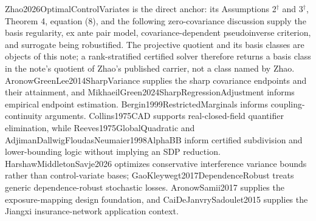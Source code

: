 Zhao2026OptimalControlVariates is the direct anchor: its Assumptions 2\(^{\dagger}\) and 3\(^{\dagger}\), Theorem 4, equation (8), and the following zero-covariance discussion supply the basis regularity, ex ante pair model, covariance-dependent pseudoinverse criterion, and surrogate being robustified.  The projective quotient and its basis classes are objects of this note; a rank-stratified certified solver therefore returns a basis class in the note's quotient of Zhao's published carrier, not a class named by Zhao.  AronowGreenLee2014SharpVariance supplies the sharp covariance endpoints and their attainment, and MikhaeilGreen2024SharpRegressionAdjustment informs empirical endpoint estimation.  Bergin1999RestrictedMarginals informs coupling-continuity arguments.  Collins1975CAD supports real-closed-field quantifier elimination, while Reeves1975GlobalQuadratic and AdjimanDallwigFloudasNeumaier1998AlphaBB inform certified subdivision and lower-bounding logic without implying an SDP reduction.  HarshawMiddletonSavje2026 optimizes conservative interference variance bounds rather than control-variate bases; GaoKleywegt2017DependenceRobust treats generic dependence-robust stochastic losses.  AronowSamii2017 supplies the exposure-mapping design foundation, and CaiDeJanvrySadoulet2015 supplies the Jiangxi insurance-network application context.